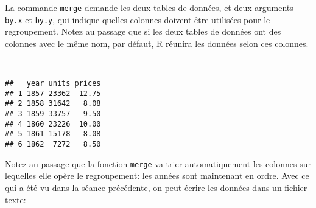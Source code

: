 La commande \texttt{merge} demande les deux tables de données, et deux arguments \texttt{by.x} et \texttt{by.y}, qui indique quelles colonnes doivent être utilisées pour le regroupement. Notez au passage que si les deux tables de données ont des colonnes avec le même nom, par défaut, R réunira les données selon ces colonnes.

\begin{knitrout}
\color{fgcolor}\begin{kframe}
\begin{flushleft}
\ttfamily\noindent
{}\hlassignement{\usebox{\hlnormalsizeboxlessthan}-}{\ }\hlkeyword{(}\hlkeyword{,}{\ }\hlkeyword{,}{\ }\hlargument{=}{\ }\hlkeyword{,}{\ }\hlargument{=}{\ }\hlkeyword{)}\hspace*{\fill}\\
\hlstd{}\hlkeyword{(}\hlkeyword{)}\mbox{}
\normalfont
\end{flushleft}
\begin{verbatim}
##   year units prices
## 1 1857 23362  12.75
## 2 1858 31642   8.08
## 3 1859 33757   9.50
## 4 1860 23226  10.00
## 5 1861 15178   8.08
## 6 1862  7272   8.50
\end{verbatim}
\end{kframe}
\end{knitrout}


Notez au passage que la fonction \texttt{merge} va trier automatiquement les colonnes sur lequelles elle opère le regroupement: les années sont maintenant en ordre. Avec ce qui a été vu dans la séance précédente, on peut écrire les données dans un fichier texte:

\begin{knitrout}
\color{fgcolor}\begin{kframe}
\begin{flushleft}
\ttfamily\noindent
{}\hlkeyword{(}\hlkeyword{,}{\ }\hlargument{=}{\ }\hlkeyword{,}{\ }\hlargument{=}{\ }\hlkeyword{)}\mbox{}
\normalfont
\end{flushleft}
\end{kframe}
\end{knitrout}

